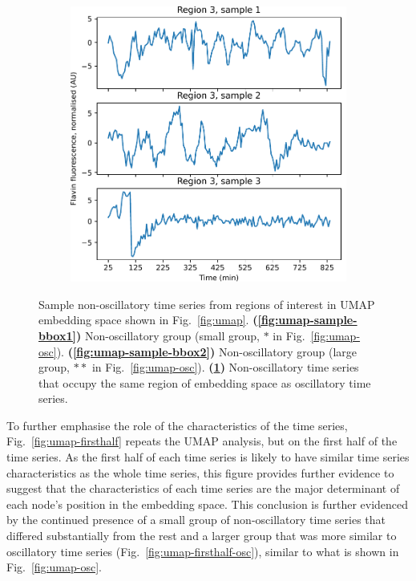 \begin{figure}
  \begin{subfigure}[t]{0.5\textwidth}
  \centering
    \includegraphics[width=\linewidth]{umap_single_is20016_bbox3.pdf}
    \caption{
    }
    \label{fig:umap-sample-bbox3}
  \end{subfigure}

  \caption[
      Sample non-oscillatory time series from regions of interest in UMAP embedding space
  ]{
      Sample non-oscillatory time series from regions of interest in UMAP embedding space shown in Fig.\ \ref{fig:umap}.
      \textbf{(\ref{fig:umap-sample-bbox1})} Non-oscillatory group (small group, $\ast$ in Fig.\ \ref{fig:umap-osc}).
      \textbf{(\ref{fig:umap-sample-bbox2})} Non-oscillatory group (large group, $\ast \ast$ in Fig.\ \ref{fig:umap-osc}).
      \textbf{(\ref{fig:umap-sample-bbox3})} Non-oscillatory time series that occupy the same region of embedding space as oscillatory time series.
    }
  \label{fig:umap-sample-regions}
\end{figure}

To further emphasise the role of the characteristics of the time series, Fig.\ \ref{fig:umap-firsthalf} repeats the UMAP analysis, but on the first half of the time series.
As the first half of each time series is likely to have similar time series characteristics as the whole time series, this figure provides further evidence to suggest that the characteristics of each time series are the major determinant of each node's position in the embedding space.
This conclusion is further evidenced by the continued presence of a small group of non-oscillatory time series that differed substantially from the rest and a larger group that was more similar to oscillatory time series (Fig.\ \ref{fig:umap-firsthalf-osc}), similar to what is shown in Fig.\ \ref{fig:umap-osc}.

